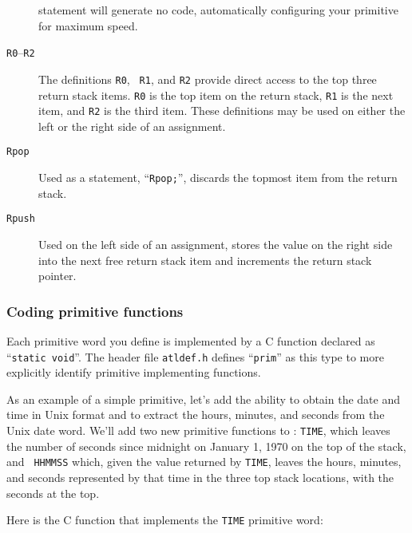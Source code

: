 \documentclass[twocolumn]{article}
\begin{document}
\begin{description}
                                statement will generate no code,
                                automatically configuring your
                                primitive for maximum speed.
\item[{\tt R0}--{\tt R2}]       The definitions {\tt R0}, {\tt
                                R1}, and {\tt R2} provide direct
                                access to the top three return stack
                                items.  {\tt R0} is the top item on
                                the return stack, {\tt R1} is the next
                                item, and {\tt R2} is the third item.
                                These definitions may be used on
                                either the left or the right side of
                                an assignment.
\item[{\tt Rpop}]               Used as a statement, ``{\tt Rpop;}'',
                                discards the topmost item from the
                                return stack.
\item[{\tt Rpush}]              Used on the left side of an
                                assignment, stores the value on the
                                right side into the next free return
                                stack item and increments the return
                                stack pointer.
\end{description}

\subsubsection{Coding primitive functions}

Each primitive word you define is implemented by a C function declared
as ``{\tt static void}''.  The header file {\tt atldef.h} defines
``{\tt prim}'' as this type to more explicitly identify primitive
implementing functions.

As an example of a simple primitive, let's add the ability to obtain
the date and time in Unix format and to extract the hours, minutes,
and seconds from the Unix date word.  We'll add two new primitive
functions to \atlast : {\tt TIME}, which leaves the number of seconds
since midnight on January 1, 1970 on the top of the stack, and {\tt
HHMMSS} which, given the value returned by {\tt TIME},
leaves the hours, minutes, and seconds represented by that time in the
three top stack locations, with the seconds at the top.

Here is the C function that implements the {\tt TIME} primitive word:
\end{document}
